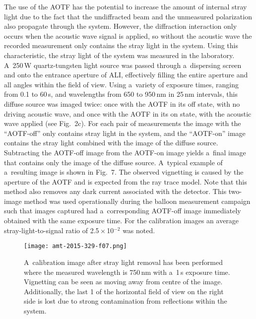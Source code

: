\documentclass[amt]{copernicus}
\begin{document}
The use of the AOTF has the potential to increase the amount of internal
stray light due to the fact that the undiffracted beam and the
unmeasured polarization also propagate through the system. However,
the diffraction interaction only occurs when the acoustic wave signal
is applied, so without the acoustic wave the recorded measurement only
contains the stray light in the system. Using this characteristic, the
stray light of the system was measured in the
laboratory. A~250\,\unit{W} quartz-tungsten light source was passed
through a~dispersing screen and onto the entrance aperture of ALI,
effectively filling the entire aperture and all angles within the
field of view. Using a~variety of exposure times, ranging from 0.1 to
60\,\unit{s}, and wavelengths from 650 to 950\,\unit{nm} in
25\,\unit{nm} intervals, this diffuse source was imaged twice: once
with the AOTF in its off state, with no driving acoustic wave, and
once with the AOTF in its on state, with the acoustic wave applied
(see Fig.~2c). For each pair of measurements the image with the
``AOTF-off'' only contains stray light in the system, and the
``AOTF-on'' image contains the stray light combined with the image of
the diffuse source. Subtracting the AOTF-off image from the
AOTF-on image yields a~final image that contains only the image of
the diffuse source. A~typical example of a~resulting image is shown in
Fig.~7. The observed vignetting is caused by the aperture of the AOTF
and is expected from the ray trace model. Note that this method also
removes any dark current associated with the detector. This two-image
method was used operationally during the balloon measurement campaign
such that images captured had a~corresponding AOTF-off image
immediately obtained with the same exposure time. For the calibration images an average stray-light-to-signal ratio of 2.5\,$\times$\,10$^{-2}$ was noted.

\begin{figure}[t]
\texttt{[image: amt-2015-329-f07.png]}
\caption{A~calibration image after stray light removal has been
  performed where the measured wavelength is 750\,\unit{nm} with
  a~1\,s exposure time.  Vignetting can be seen as moving away from
  centre of the image. Additionally, the last 1{\degree} of the
  horizontal field of view on the right side is lost due to strong
  contamination from reflections within the system.}
\end{figure}
\end{document}
